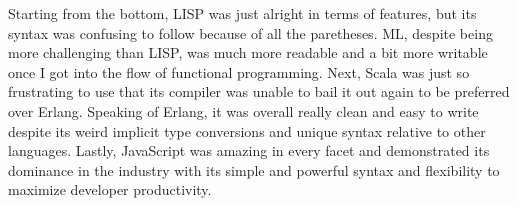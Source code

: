 \documentclass[letterpaper, 10pt, DIV=13]{scrartcl}
\numberwithin{equation}{section}
\numberwithin{figure}{section}
\numberwithin{table}{section}
\begin{document}
Starting from the bottom, LISP was just alright in terms of features, but its syntax was confusing to follow because of all the paretheses. ML, despite being more
challenging than LISP, was much more readable and a bit more writable once I got into the flow of functional programming. Next, Scala was just so frustrating to use
that its compiler was unable to bail it out again to be preferred over Erlang. Speaking of Erlang, it was overall really clean and easy to write despite its weird
implicit type conversions and unique syntax relative to other languages. Lastly, JavaScript was amazing in every facet and demonstrated its dominance in the industry
with its simple and powerful syntax and flexibility to maximize developer productivity.
\end{document}

